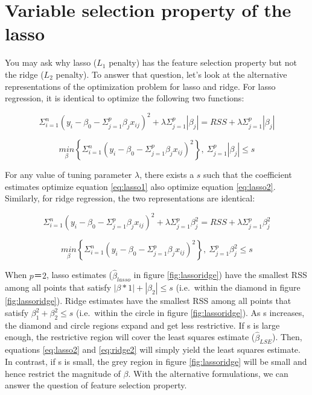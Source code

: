 \documentclass[12pt,]{krantz}
\begin{document}
\hypertarget{variable-selection-property-of-the-lasso}{%
\section{Variable selection property of the lasso}\label{variable-selection-property-of-the-lasso}}

You may ask why lasso (\(L_1\) penalty) has the feature selection property but not the ridge (\(L_2\) penalty). To answer that question, let's look at the alternative representations of the optimization problem for lasso and ridge. For lasso regression, it is identical to optimize the following two functions:

\begin{equation}
\Sigma_{i=1}^{n}(y_{i}-\beta_{0}-\Sigma_{j=1}^{p}\beta_{j}x_{ij})^{2}+\lambda\Sigma_{j=1}^{p}|\beta_{j}|=RSS+\lambda\Sigma_{j=1}^{p}|\beta_{j}|
\label{eq:lasso1}
\end{equation}

\begin{equation}
\underset{\beta}{min}\left\{ \Sigma_{i=1}^{n}\left(y_{i}-\beta_{0}-\Sigma_{j=1}^{p}\beta_{j}x_{ij}\right)^{2}\right\} ,\ \Sigma_{j=1}^{p}|\beta_{j}|\leq s
\label{eq:lasso2}
\end{equation}

For any value of tuning parameter \(\lambda\), there exists a \(s\) such that the coefficient estimates optimize equation \eqref{eq:lasso1} also optimize equation \eqref{eq:lasso2}. Similarly, for ridge regression, the two representations are identical:

\begin{equation}
\Sigma_{i=1}^{n}(y_{i}-\beta_{0}-\Sigma_{j=1}^{p}\beta_{j}x_{ij})^{2}+\lambda\Sigma_{j=1}^{p}\beta_{j}^{2}=RSS+\lambda\Sigma_{j=1}^{p}\beta_{j}^{2}
\label{eq:ridge1}
\end{equation}

\begin{equation}
\underset{\beta}{min}\left\{ \Sigma_{i=1}^{n}\left(y_{i}-\beta_{0}-\Sigma_{j=1}^{p}\beta_{j}x_{ij}\right)^{2}\right\} ,\ \Sigma_{j=1}^{p}\beta_{j}^{2}\leq s
\label{eq:ridge2}
\end{equation}

When \(p＝2\), lasso estimates (\(\hat{\beta}_{lasso}\) in figure \ref{fig:lassoridge}) have the smallest RSS among all points that satisfy \(|\beta*{1}|+|\beta_{2}|\leq s\) (i.e.~within the diamond in figure \ref{fig:lassoridge}). Ridge estimates have the smallest RSS among all points that satisfy \(\beta_{1}^{2}+\beta_{2}^{2}\leq s\) (i.e.~within the circle in figure \ref{fig:lassoridge}). As s increases, the diamond and circle regions expand and get less restrictive. If s is large enough, the restrictive region will cover the least squares estimate (\(\hat{\beta}_{LSE}\)). Then, equations \eqref{eq:lasso2} and \eqref{eq:ridge2} will simply yield the least squares estimate. In contrast, if s is small, the grey region in figure \ref{fig:lassoridge} will be small and hence restrict the magnitude of \(\beta\). With the alternative formulations, we can answer the question of feature selection property.
\end{document}
